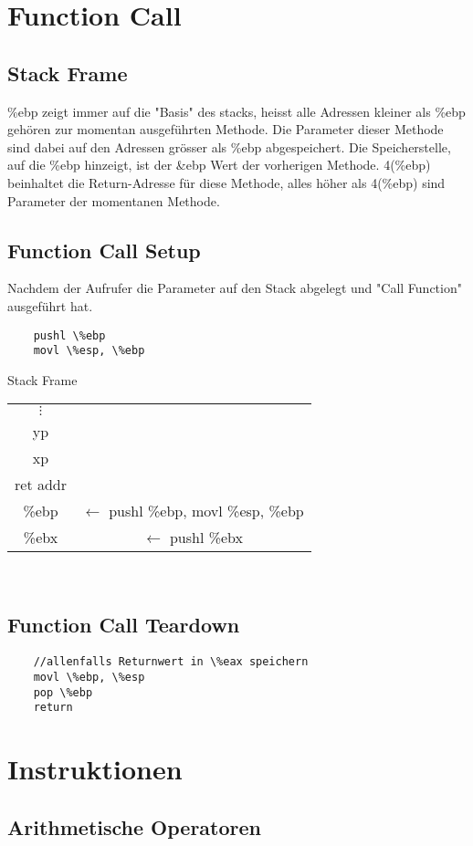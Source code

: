 \documentclass[a4paper, 11pt]{article}
\begin{document}
\section{Function Call}
\subsection{Stack Frame}
\%ebp zeigt immer auf die "Basis" des stacks, heisst alle Adressen kleiner als \%ebp gehören zur momentan ausgeführten Methode. Die Parameter dieser Methode sind dabei auf den Adressen grösser als \%ebp abgespeichert. Die Speicherstelle, auf die \%ebp hinzeigt, ist der \&ebp Wert der vorherigen Methode. 4(\%ebp) beinhaltet die Return-Adresse für diese Methode, alles höher als 4(\%ebp) sind Parameter der momentanen Methode.

\subsection{Function Call Setup}
Nachdem der Aufrufer die Parameter auf den Stack abgelegt und "Call Function" ausgeführt hat.
\begin{lstlisting}
	pushl \%ebp
	movl \%esp, \%ebp
\end{lstlisting}

Stack Frame
\begin{tabular}{|c|c}
	$\vdots$&\\\cline{0-0}
	yp\\\cline{0-0}
	xp\\\cline{0-0}
	ret addr\\\cline{0-0}
	\%ebp & $\leftarrow$ pushl \%ebp, movl \%esp, \%ebp\\\cline{0-0}
	\%ebx & $\leftarrow$ pushl \%ebx\\\cline{0-0}
\end{tabular}\\

\subsection{Function Call Teardown}
\begin{lstlisting}
	//allenfalls Returnwert in \%eax speichern
	movl \%ebp, \%esp
	pop \%ebp
	return
\end{lstlisting}

\section{Instruktionen}
\subsection{Arithmetische Operatoren}
\end{document}
